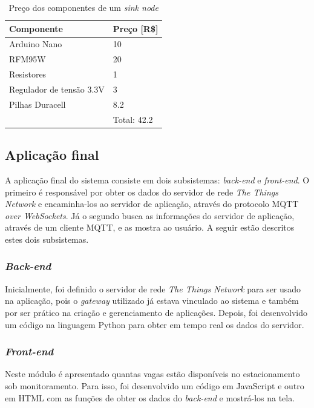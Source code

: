 \documentclass[oneside,openright,12pt]{ufsm_2015} %
\begin{document}
    \begin{table}
   	    \caption{Preço dos componentes de um \textit{sink node}}
	    \centering
	    \begin{tabular}{ l | l }
	    \hline
	    Componente & Preço [R\$]\\
	    \hline
	    Arduino Nano & 10 \\
	    \hline
	    RFM95W & 20\\
	    \hline
	    Resistores & 1\\
	    \hline
	    Regulador de tensão 3.3V & 3\\
	    \hline
	    Pilhas Duracell & 8.2\\
	    \hline
	    & Total: 42.2
	    \end{tabular}
	    \vspace{\baselineskip} %
	    \label{table:preco-sink-node}
\end{table}
    
    \subsection{Aplicação final}
    A aplicação final do sistema consiste em dois subsistemas: \textit{back-end} e \textit{front-end}. O primeiro é responsável por obter os dados do servidor de rede \textit{The Things Network} e encaminha-los ao servidor de aplicação, através do protocolo MQTT \textit{over WebSockets}. Já o segundo busca as informações do servidor de aplicação, através de um cliente MQTT, e as mostra ao usuário.
    A seguir estão descritos estes dois subsistemas.
    
    \subsubsection{\textit{Back-end}}
    Inicialmente, foi definido o servidor de rede \textit{The Things Network} para ser usado na aplicação, pois o \textit{gateway} utilizado já estava vinculado ao sistema e também por ser prático na criação e gerenciamento de aplicações. Depois, foi desenvolvido um código na linguagem Python para obter em tempo real os dados do servidor. 
    
    \subsubsection{\textit{Front-end}}
    Neste módulo é apresentado quantas vagas estão disponíveis no estacionamento sob monitoramento. Para isso, foi desenvolvido um código em JavaScript e outro em HTML com as funções de obter os dados do \textit{back-end} e mostrá-los na tela. 
    
\end{document}

